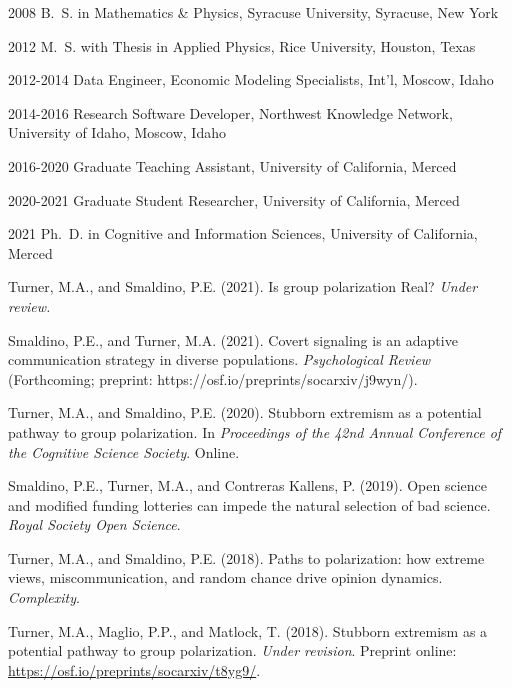 \documentclass[12pt,chapterheads]{UCMerced}
\begin{document}
\begin{frontmatter}
\begin{vitapage}
\begin{vita}
\item[2008] B.~S. in Mathematics \& Physics, Syracuse University, Syracuse, New York
\item[2012] M.~S. with Thesis in Applied Physics, Rice University, Houston, Texas
\item[2012-2014] Data Engineer, Economic Modeling Specialists, Int'l, Moscow, Idaho
\item[2014-2016] Research Software Developer, Northwest Knowledge Network, University of Idaho, Moscow, Idaho
  \item[2016-2020] Graduate Teaching Assistant, University of California, Merced
  \item[2020-2021] Graduate Student Researcher,  University of California, Merced
  \item[2021] Ph.~D. in Cognitive and Information Sciences, University of California, Merced
\end{vita}
\begin{publications}
  \item 
    Turner, M.A., and Smaldino, P.E. (2021). Is group polarization Real? \emph{Under review.}
  \item
    Smaldino, P.E., and Turner, M.A. (2021). 
    Covert signaling is an adaptive communication strategy in diverse populations.
    \emph{Psychological Review} (Forthcoming; preprint: https://osf.io/preprints/socarxiv/j9wyn/).
  \item 
    Turner, M.A., and Smaldino, P.E. (2020).  Stubborn extremism as a potential pathway to group polarization. 
    In \emph{Proceedings of the 42nd Annual Conference of the Cognitive Science Society}. Online.
  \item
    Smaldino, P.E., Turner, M.A., and Contreras Kallens, P. (2019). Open science and modified funding
    lotteries can impede the natural selection of bad science. \emph{Royal Society Open Science}.
  \item 
    Turner, M.A., and Smaldino, P.E. (2018).  Paths to polarization: how extreme views,
    miscommunication, and random chance drive opinion dynamics.  \emph{Complexity}.
  \item 
    Turner, M.A., Maglio, P.P., and Matlock, T. (2018).  Stubborn extremism as a potential pathway to group polarization. 
    \emph{Under revision}. Preprint online: \url{https://osf.io/preprints/socarxiv/t8yg9/}.
\end{publications}
\end{vitapage}


\end{frontmatter}
\end{document}
